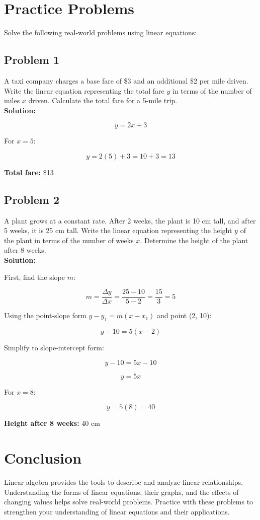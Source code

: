 \documentclass[12pt]{article}
\begin{document}
\section*{Practice Problems}

Solve the following real-world problems using linear equations:

\subsection*{Problem 1}

A taxi company charges a base fare of \$3 and an additional \$2 per mile driven. Write the linear equation representing the total fare \( y \) in terms of the number of miles \( x \) driven. Calculate the total fare for a 5-mile trip.\\

\textbf{Solution:}

\[
y = 2x + 3
\]

For \( x = 5 \):

\[
y = 2(5) + 3 = 10 + 3 = 13
\]

\textbf{Total fare:} \$13

\newpage

\subsection*{Problem 2}

A plant grows at a constant rate. After 2 weeks, the plant is 10 cm tall, and after 5 weeks, it is 25 cm tall. Write the linear equation representing the height \( y \) of the plant in terms of the number of weeks \( x \). Determine the height of the plant after 8 weeks.\\

\textbf{Solution:}

First, find the slope \( m \):

\[
m = \frac{\Delta y}{\Delta x} = \frac{25 - 10}{5 - 2} = \frac{15}{3} = 5
\]

Using the point-slope form \( y - y_1 = m(x - x_1) \) and point (2, 10):

\[
y - 10 = 5(x - 2)
\]

Simplify to slope-intercept form:

\[
y - 10 = 5x - 10
\]

\[
y = 5x
\]

For \( x = 8 \):

\[
y = 5(8) = 40
\]

\textbf{Height after 8 weeks:} 40 cm\\

\section*{Conclusion}

Linear algebra provides the tools to describe and analyze linear relationships. Understanding the forms of linear equations, their graphs, and the effects of changing values helps solve real-world problems. Practice with these problems to strengthen your understanding of linear equations and their applications.
\end{document}
